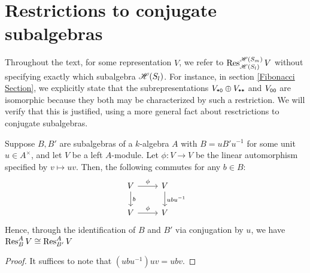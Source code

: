 \documentclass{amsart}
\begin{document}
\section{Restrictions to conjugate subalgebras}\label{Algebra}
Throughout the text, for some representation $V$, we refer to $\operatorname{Res}_{\mathscr{H}(S_{l})}^{\mathscr{H}(S_m)} V$ without specifying exactly which subalgebra $\mathscr{H}(S_{l})$.
For instance, in section \ref{Fibonacci Section}, we explicitly state that the subrepresentations $V_{\texttt{*}\texttt{0}} \oplus V_{\texttt{*}\texttt{*}}$ and $V_{\texttt{0}\texttt{0}}$ are isomorphic because they both may be characterized by such a restriction.
We will verify that this is justified, using a more general fact about resctrictions to conjugate subalgebras.
\begin{proposition}
  Suppose $B,B'$ are subalgebras of a $k$-algebra $A$ with $B = uB'u^{-1}$ for some unit $u \in A^\times$, and let $V$ be a left $A$-module.
  Let $\phi:V \rightarrow V$ be the linear automorphism specified by $v \mapsto uv$.
  Then, the following commutes for any $b \in B$:
  \[
    \begin{tikzcd}
      V \arrow[r,"\phi"] \arrow[d,"b"] & V \arrow[d,"ubu^{-1}"]\\
      V \arrow[r,"\phi"] & V
    \end{tikzcd}
  \]
  Hence, through the identification of $B$ and $B'$ via conjugation by $u$, we have $\operatorname{Res}_{B}^A V \cong \operatorname{Res}_{B'}^A V$
\end{proposition}
\begin{proof}
  It suffices to note that $(ubu^{-1})uv = ubv$.
\end{proof}
\end{document}
